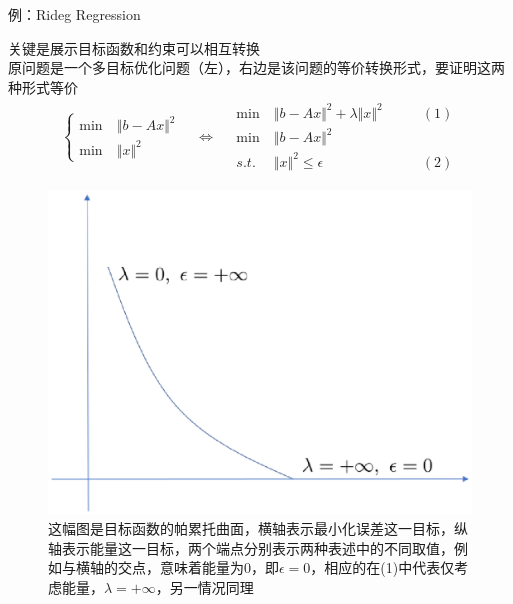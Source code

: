 \documentclass[11pt]{ctexart}         %
\newcommand{\rebacklinespread}[1][-12pt]{\vspace{#1}}
\newcommand{\oneline}[1][12pt]{\vspace{#1}}
\newcommand{\ba}[1]{\begin{align*}#1\end{align*}}
\newcommand{\bc}[1]{\begin{cases}#1\end{cases}}
\newcommand{\li}[3][例]{
	#1：#2\\ 
	\phantom{#1：}\begin{minipage}[t]{0.9\linewidth}%
	\setlength\parskip{12pt}
	#3
	\end{minipage}
	\oneline}
\newcommand{\paint}[2][red]{{\color{#1}#2}} %
\newcommand{\VV}[1]{\Vert #1 \Vert}
\begin{document}
\li{Rideg Regression}{
	\vspace{-24pt}
	\paint{关键是展示目标函数和约束可以相互转换}\\
	原问题是一个多目标优化问题（左），右边是该问题的等价转换形式，要证明这两种形式等价
	\rebacklinespread
	\ba{
		\bc{\min\ &\VV{b-Ax}^2\\ 
			\min\ &\VV{x}^2}
		\quad\Leftrightarrow\quad
		\begin{array}{lll}
			\min\  &\VV{b-Ax}^2+\lambda\VV{x}^2\qquad &(1)\\
			\min\  &\VV{b-Ax}^2&\\
			s.t.\  &\VV{x}^2\leq \epsilon\qquad &(2)
		\end{array}
	}
	
}
\begin{figure}[h]
	\centering
	\includegraphics[width=0.5\linewidth]{imgs/ridge.eps}
	\caption{这幅图是目标函数的帕累托曲面，横轴表示最小化误差这一目标，纵轴表示能量这一目标，两个端点分别表示两种表述中的不同取值，例如与横轴的交点，意味着能量为0，即$ \epsilon=0 $，相应的在(1)中代表仅考虑能量，$ \lambda=+\infty $，另一情况同理}
\end{figure}
\end{document}
